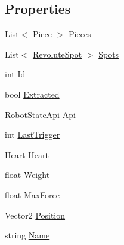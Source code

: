 \subsection*{Properties}
\begin{DoxyCompactItemize}
\item 
List$<$ \hyperlink{classgearit_1_1src_1_1robot_1_1_piece}{Piece} $>$ \hyperlink{classgearit_1_1src_1_1robot_1_1_robot_aaf664027db298c7648f6537998cbb898}{Pieces}
\item 
List$<$ \hyperlink{classgearit_1_1src_1_1robot_1_1_revolute_spot}{Revolute\+Spot} $>$ \hyperlink{classgearit_1_1src_1_1robot_1_1_robot_a47e6e14ba9a13c0ddb474a76dfdef307}{Spots}
\item 
int \hyperlink{classgearit_1_1src_1_1robot_1_1_robot_a00d317eb97a55808ba8e238c4349cfdb}{Id}
\item 
bool \hyperlink{classgearit_1_1src_1_1robot_1_1_robot_a8d279a6a32a161cfa5de8e5a3baf46aa}{Extracted}
\item 
\hyperlink{classgearit_1_1src_1_1script_1_1_robot_state_api}{Robot\+State\+Api} \hyperlink{classgearit_1_1src_1_1robot_1_1_robot_abd743aa87fbb407a0112d4febd0d7d8b}{Api}
\item 
int \hyperlink{classgearit_1_1src_1_1robot_1_1_robot_afe59a254b7beec2e30d93471cbced525}{Last\+Trigger}
\item 
\hyperlink{classgearit_1_1src_1_1robot_1_1_heart}{Heart} \hyperlink{classgearit_1_1src_1_1robot_1_1_robot_a997f94766781e22b420281d9175bdb11}{Heart}
\item 
float \hyperlink{classgearit_1_1src_1_1robot_1_1_robot_a474061eeda5239305f83fa5450499e53}{Weight}
\item 
float \hyperlink{classgearit_1_1src_1_1robot_1_1_robot_abb73a758e331cd30a102ea19107fa9b3}{Max\+Force}
\item 
Vector2 \hyperlink{classgearit_1_1src_1_1robot_1_1_robot_abc013d298542760926d94c21fd254905}{Position}
\item 
string \hyperlink{classgearit_1_1src_1_1robot_1_1_robot_a193231ca77174695b8e0257b43c5cebf}{Name}
\end{DoxyCompactItemize}


